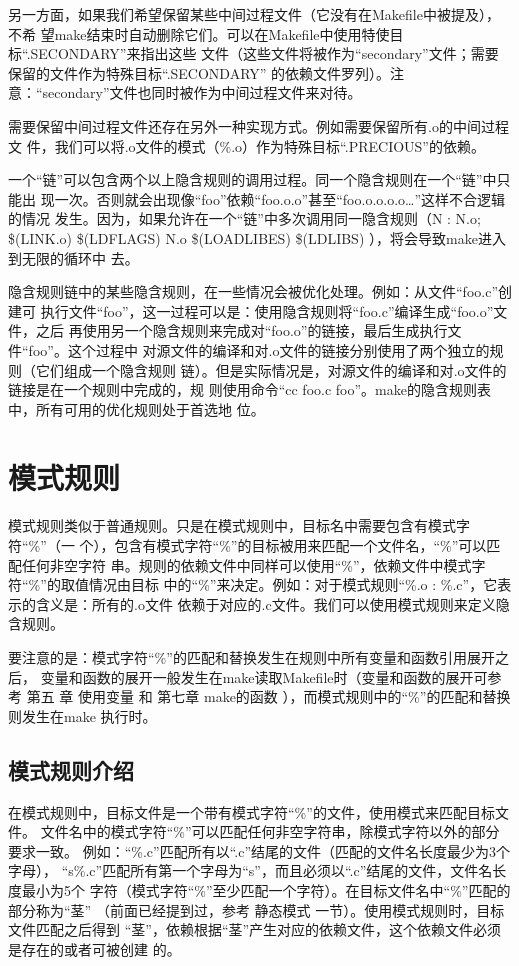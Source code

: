 另一方面，如果我们希望保留某些中间过程文件（它没有在Makefile中被提及），不希
望make结束时自动删除它们。可以在Makefile中使用特使目标“.SECONDARY”来指出这些
文件（这些文件将被作为“secondary”文件；需要保留的文件作为特殊目标“.SECONDARY”
的依赖文件罗列）。注意：“secondary”文件也同时被作为中间过程文件来对待。


需要保留中间过程文件还存在另外一种实现方式。例如需要保留所有.o的中间过程文
件，我们可以将.o文件的模式（\%.o）作为特殊目标“.PRECIOUS”的依赖。

一个“链”可以包含两个以上隐含规则的调用过程。同一个隐含规则在一个“链”中只能出
现一次。否则就会出现像“foo”依赖“foo.o.o”甚至“foo.o.o.o.o…”这样不合逻辑的情况
发生。因为，如果允许在一个“链”中多次调用同一隐含规则（N : N.o; \$(LINK.o)
\$(LDFLAGS) N.o \$(LOADLIBES) \$(LDLIBS) ），将会导致make进入到无限的循环中
去。

隐含规则链中的某些隐含规则，在一些情况会被优化处理。例如：从文件“foo.c”创建可
执行文件“foo”，这一过程可以是：使用隐含规则将“foo.c”编译生成“foo.o”文件，之后
再使用另一个隐含规则来完成对“foo.o”的链接，最后生成执行文件“foo”。这个过程中
对源文件的编译和对.o文件的链接分别使用了两个独立的规则（它们组成一个隐含规则
链）。但是实际情况是，对源文件的编译和对.o文件的链接是在一个规则中完成的，规
则使用命令“cc foo.c foo”。make的隐含规则表中，所有可用的优化规则处于首选地
位。

\section{模式规则}
模式规则类似于普通规则。只是在模式规则中，目标名中需要包含有模式字符“\%”（一
个），包含有模式字符“\%”的目标被用来匹配一个文件名，“\%”可以匹配任何非空字符
串。规则的依赖文件中同样可以使用“\%”，依赖文件中模式字符“\%”的取值情况由目标
中的“\%”来决定。例如：对于模式规则“\%.o : \%.c”，它表示的含义是：所有的.o文件
依赖于对应的.c文件。我们可以使用模式规则来定义隐含规则。

要注意的是：模式字符“\%”的匹配和替换发生在规则中所有变量和函数引用展开之后，
变量和函数的展开一般发生在make读取Makefile时（变量和函数的展开可参考 第五 章
使用变量 和  第七章 make的函数 ），而模式规则中的“\%”的匹配和替换则发生在make
执行时。


\subsection{模式规则介绍}
在模式规则中，目标文件是一个带有模式字符“\%”的文件，使用模式来匹配目标文件。
文件名中的模式字符“\%”可以匹配任何非空字符串，除模式字符以外的部分要求一致。
例如：“\%.c”匹配所有以“.c”结尾的文件（匹配的文件名长度最少为3个字母），
“s\%.c”匹配所有第一个字母为“s”，而且必须以“.c”结尾的文件，文件名长度最小为5个
字符（模式字符“\%”至少匹配一个字符）。在目标文件名中“\%”匹配的部分称为“茎”
（前面已经提到过，参考 静态模式 一节）。使用模式规则时，目标文件匹配之后得到
“茎”，依赖根据“茎”产生对应的依赖文件，这个依赖文件必须是存在的或者可被创建
的。

